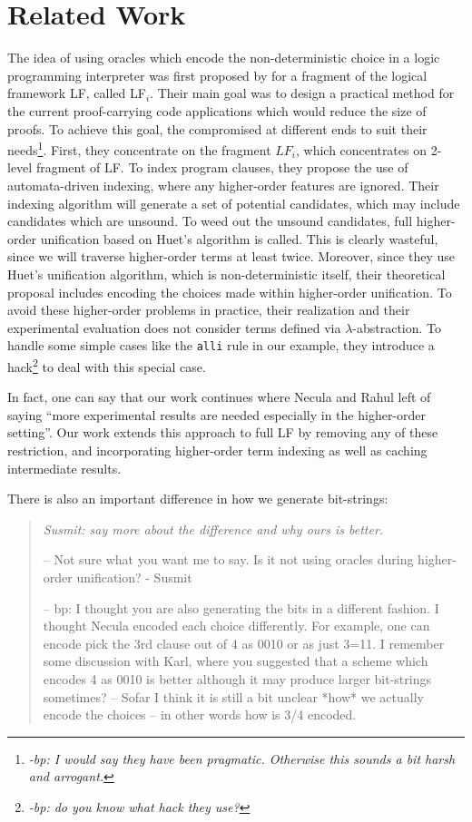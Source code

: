 \documentclass{acmconf}
\newcommand{\ednote}[1]{\footnote{\it #1}}
\newenvironment{note}{\begin{quote}\message{note!}\it}{\end{quote}}
\begin{document}
\section{Related Work}
The idea of using oracles which encode the non-deterministic choice in
a logic programming interpreter was first proposed by
\cite{Necula+01:oracle} for a fragment of the logical framework LF,
called LF$_i$. Their main goal was to design a practical method for
the current proof-carrying code applications which would reduce the
size of proofs. To achieve this goal, the compromised at different
ends to suit their needs\ednote{-bp: I would say they have been
  pragmatic. Otherwise this sounds a bit harsh and arrogant. }. First,
they concentrate on the fragment $LF_i$, which concentrates on 2-level fragment of
LF. To index program clauses, they propose the use of automata-driven
indexing, where any higher-order features are ignored. Their
indexing algorithm will generate a set of potential candidates, which
may include candidates which are unsound. To weed out the unsound
candidates, full higher-order unification based on Huet's algorithm is
called. This is clearly wasteful, since we will traverse higher-order
terms at least twice. Moreover, since they use Huet's unification
algorithm, which is non-deterministic itself, their theoretical
proposal includes encoding the choices made within higher-order
unification. To avoid these higher-order problems in practice, their
realization and their experimental evaluation does not consider 
terms defined via $\lambda$-abstraction. To handle some simple cases
like the {\tt alli} rule in our example, they introduce a
hack\ednote{-bp: do you know what hack they use?} to deal
with this special case. 

In fact, one can say that  our work continues where Necula and Rahul
left of saying ``more experimental results are needed especially in
the higher-order setting''. Our work extends this approach to full LF
by removing any of these restriction, and incorporating higher-order
term indexing as well as caching intermediate results.

There is also an important difference in how we generate bit-strings:

\begin{note}
  Susmit: say more about the difference and why ours is better.

-- Not sure what you want me to say. Is it not using oracles during
   higher-order unification? - Susmit

-- bp: I thought you are also generating the bits in a different
fashion. I thought Necula encoded each choice differently. For
example, one can encode pick the 3rd clause out of 4 as 0010
or as just 3=11. I remember some discussion with Karl, where you
suggested that a scheme which encodes 4 as 0010 is better although it
may produce larger bit-strings sometimes? -- Sofar I think it is still
a bit unclear *how* we actually encode the choices -- in other words
how is 3/4 encoded.

\end{note}
\end{document}

